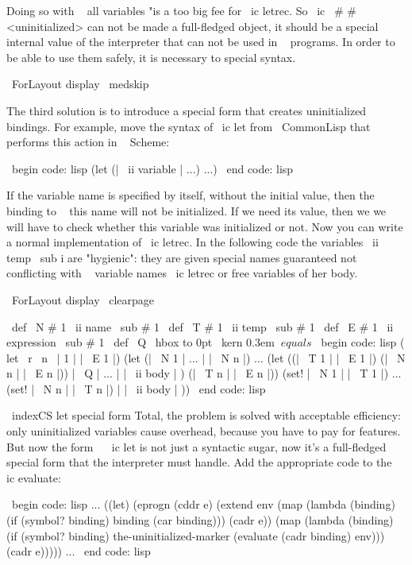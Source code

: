 {Doing so with ~ all variables "is a too big fee for \ ic {letrec}.
So \ ic { \ # # <uninitialized>} can not be made a full-fledged object, it should
be a special internal value of the interpreter that can not be used
in ~ programs. In order to be able to use them safely, it is necessary to
special syntax.

\ ForLayout {display} { \ medskip }

The third solution is to introduce a special form that creates
uninitialized bindings. For example, move the syntax of \ ic {let} from
{ \ CommonLisp } that performs this action in ~ Scheme:

\ begin {code: lisp}
(let (| \ ii {variable} | ...)
  ...)
\ end {code: lisp}

If the variable name is specified by itself, without the initial value, then the binding
to ~ this name will not be initialized. If we need its value, then we
we will have to check whether this variable was initialized or not.
Now you can write a normal implementation of \ ic {letrec}. In the following code
the variables \ ii {temp \ sub {i}} are "hygienic": they are given special
names guaranteed not conflicting with ~ variable names \ ic {letrec} or
free variables of her body.

\ ForLayout {display} { \ clearpage }

{ \ def \ N # 1 { \ ii {name \ sub {# 1}}}
\ def \ T # 1 { \ ii {temp \ sub {# 1}}}
\ def \ E # 1 { \ ii {expression \ sub {# 1}}}
\ def \ Q { \ hbox to 0pt { \ kern 0.3em $ \ equals $ }}
\ begin {code: lisp}
( let \ r \ n \ | 1 | | \ E 1 |) (let (| \ N 1 | ... | | \ N n |)
         ... (let ((| \ T 1 | | \ E 1 |)
         (| \ N n | | \ E n |)) | \ Q | ...
  | | \ ii {body} | ) (| \ T n | | \ E n |))
                                      (set! | \ N 1 | | \ T 1 |)
                                      ...
                                      (set! | \ N n | | \ T n |)
                                      | | \ ii {body} | ))
\ end {code: lisp}}

\ indexCS {let} {special form}
Total, the problem is solved with acceptable efficiency: only uninitialized
variables cause overhead, because you have to pay for features.
But now the form ~ \ ic {let} is not just a syntactic sugar, now it's
a full-fledged special form that the interpreter must handle.
Add the appropriate code to the \\ ic {evaluate}:

\ begin {code: lisp}
...
((let)
 (eprogn (cddr e)
         (extend env
                 (map (lambda (binding)
                        (if (symbol? binding) binding
                            (car binding)))
                      (cadr e))
                 (map (lambda (binding)
                        (if (symbol? binding) the-uninitialized-marker
                            (evaluate (cadr binding) env)))
                      (cadr e))))) ...
\ end {code: lisp}

}
